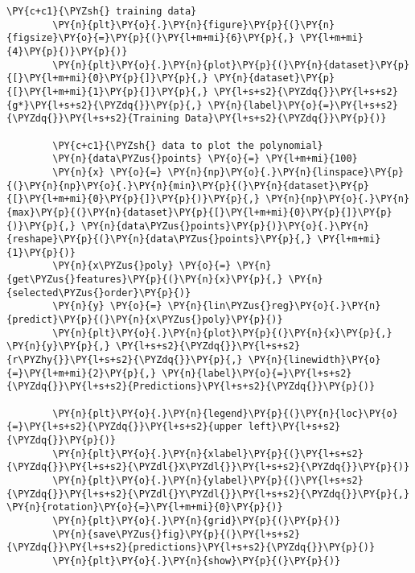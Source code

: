 \documentclass[a4paper,11pt]{article}%
\begin{document}
\begin{tcolorbox}[breakable, size=fbox, boxrule=1pt, pad at break*=1mm,colback=cellbackground, colframe=cellborder]
	\begin{Verbatim}[commandchars=\\\{\}]
		\PY{c+c1}{\PYZsh{} training data}
		\PY{n}{plt}\PY{o}{.}\PY{n}{figure}\PY{p}{(}\PY{n}{figsize}\PY{o}{=}\PY{p}{(}\PY{l+m+mi}{6}\PY{p}{,} \PY{l+m+mi}{4}\PY{p}{)}\PY{p}{)}
		\PY{n}{plt}\PY{o}{.}\PY{n}{plot}\PY{p}{(}\PY{n}{dataset}\PY{p}{[}\PY{l+m+mi}{0}\PY{p}{]}\PY{p}{,} \PY{n}{dataset}\PY{p}{[}\PY{l+m+mi}{1}\PY{p}{]}\PY{p}{,} \PY{l+s+s2}{\PYZdq{}}\PY{l+s+s2}{g*}\PY{l+s+s2}{\PYZdq{}}\PY{p}{,} \PY{n}{label}\PY{o}{=}\PY{l+s+s2}{\PYZdq{}}\PY{l+s+s2}{Training Data}\PY{l+s+s2}{\PYZdq{}}\PY{p}{)}
		
		\PY{c+c1}{\PYZsh{} data to plot the polynomial}
		\PY{n}{data\PYZus{}points} \PY{o}{=} \PY{l+m+mi}{100}
		\PY{n}{x} \PY{o}{=} \PY{n}{np}\PY{o}{.}\PY{n}{linspace}\PY{p}{(}\PY{n}{np}\PY{o}{.}\PY{n}{min}\PY{p}{(}\PY{n}{dataset}\PY{p}{[}\PY{l+m+mi}{0}\PY{p}{]}\PY{p}{)}\PY{p}{,} \PY{n}{np}\PY{o}{.}\PY{n}{max}\PY{p}{(}\PY{n}{dataset}\PY{p}{[}\PY{l+m+mi}{0}\PY{p}{]}\PY{p}{)}\PY{p}{,} \PY{n}{data\PYZus{}points}\PY{p}{)}\PY{o}{.}\PY{n}{reshape}\PY{p}{(}\PY{n}{data\PYZus{}points}\PY{p}{,} \PY{l+m+mi}{1}\PY{p}{)}
		\PY{n}{x\PYZus{}poly} \PY{o}{=} \PY{n}{get\PYZus{}features}\PY{p}{(}\PY{n}{x}\PY{p}{,} \PY{n}{selected\PYZus{}order}\PY{p}{)}
		\PY{n}{y} \PY{o}{=} \PY{n}{lin\PYZus{}reg}\PY{o}{.}\PY{n}{predict}\PY{p}{(}\PY{n}{x\PYZus{}poly}\PY{p}{)}
		\PY{n}{plt}\PY{o}{.}\PY{n}{plot}\PY{p}{(}\PY{n}{x}\PY{p}{,} \PY{n}{y}\PY{p}{,} \PY{l+s+s2}{\PYZdq{}}\PY{l+s+s2}{r\PYZhy{}}\PY{l+s+s2}{\PYZdq{}}\PY{p}{,} \PY{n}{linewidth}\PY{o}{=}\PY{l+m+mi}{2}\PY{p}{,} \PY{n}{label}\PY{o}{=}\PY{l+s+s2}{\PYZdq{}}\PY{l+s+s2}{Predictions}\PY{l+s+s2}{\PYZdq{}}\PY{p}{)}
		
		\PY{n}{plt}\PY{o}{.}\PY{n}{legend}\PY{p}{(}\PY{n}{loc}\PY{o}{=}\PY{l+s+s2}{\PYZdq{}}\PY{l+s+s2}{upper left}\PY{l+s+s2}{\PYZdq{}}\PY{p}{)}
		\PY{n}{plt}\PY{o}{.}\PY{n}{xlabel}\PY{p}{(}\PY{l+s+s2}{\PYZdq{}}\PY{l+s+s2}{\PYZdl{}X\PYZdl{}}\PY{l+s+s2}{\PYZdq{}}\PY{p}{)}
		\PY{n}{plt}\PY{o}{.}\PY{n}{ylabel}\PY{p}{(}\PY{l+s+s2}{\PYZdq{}}\PY{l+s+s2}{\PYZdl{}Y\PYZdl{}}\PY{l+s+s2}{\PYZdq{}}\PY{p}{,} \PY{n}{rotation}\PY{o}{=}\PY{l+m+mi}{0}\PY{p}{)}
		\PY{n}{plt}\PY{o}{.}\PY{n}{grid}\PY{p}{(}\PY{p}{)}
		\PY{n}{save\PYZus{}fig}\PY{p}{(}\PY{l+s+s2}{\PYZdq{}}\PY{l+s+s2}{predictions}\PY{l+s+s2}{\PYZdq{}}\PY{p}{)}
		\PY{n}{plt}\PY{o}{.}\PY{n}{show}\PY{p}{(}\PY{p}{)}
	\end{Verbatim}
\end{tcolorbox}

\begin{figure}[h]
	\centering
	\caption{}
	\label{fig:top_level}
\end{figure}
\end{document}
